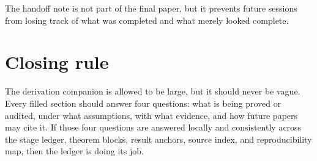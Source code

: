 The handoff note is not part of the final paper, but it prevents future sessions from losing track of what was completed and what merely looked complete.

\section{Closing rule}
\label{sec:fill-closing-rule}

The derivation companion is allowed to be large, but it should never be vague.  Every filled section should answer four questions: what is being proved or audited, under what assumptions, with what evidence, and how future papers may cite it.  If those four questions are answered locally and consistently across the stage ledger, theorem blocks, result anchors, source index, and reproducibility map, then the ledger is doing its job.
